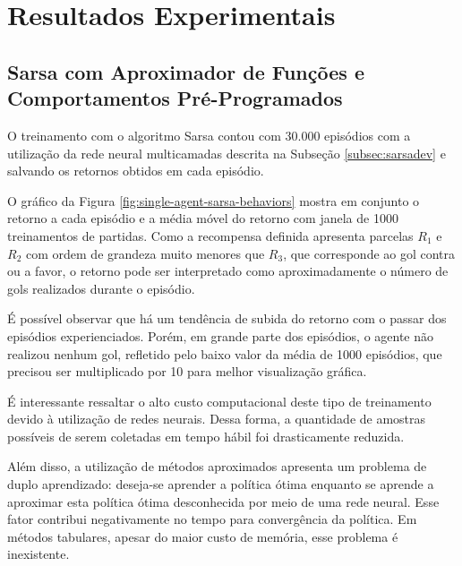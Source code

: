 \chapter{Resultados Experimentais}
\label{chap:Resultados}





\section{Sarsa com Aproximador de Funções e Comportamentos Pré-Programados}

O treinamento com o algoritmo Sarsa contou com 30.000 episódios com a utilização da rede neural multicamadas descrita na Subseção \ref{subsec:sarsadev} e salvando os retornos obtidos em cada episódio.

O gráfico da Figura \ref{fig:single-agent-sarsa-behaviors} mostra em conjunto o retorno a cada episódio e a média móvel do retorno com janela de 1000 treinamentos de  partidas. Como a recompensa definida apresenta parcelas $R_1$ e $R_2$ com ordem de grandeza muito menores que $R_3$, que corresponde ao gol contra ou a favor, o retorno pode ser interpretado como aproximadamente o número de gols realizados durante o episódio.

É possível observar que há um tendência de subida do retorno com o passar dos episódios experienciados. Porém, em grande parte dos episódios, o agente não realizou nenhum gol, refletido pelo baixo valor da média de 1000 episódios, que precisou ser multiplicado por 10 para melhor visualização gráfica.

É interessante ressaltar o alto custo computacional deste tipo de treinamento devido à utilização de redes neurais. Dessa forma, a quantidade de amostras possíveis de serem coletadas em tempo hábil foi drasticamente reduzida.

Além disso, a utilização de métodos aproximados apresenta um problema de duplo aprendizado: deseja-se aprender a política ótima enquanto se aprende a aproximar esta política ótima desconhecida por meio de uma rede neural. Esse fator contribui negativamente no tempo para convergência da política. Em métodos tabulares, apesar do maior custo de memória, esse problema é inexistente.

